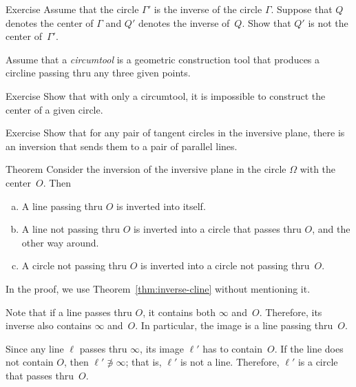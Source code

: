 \begin{thm}{Exercise}\label{ex:inv-center not=center-inv}
Assume that the circle $\Gamma'$ is the inverse of the circle $\Gamma$.
Suppose that $Q$ denotes the center of $\Gamma$ and $Q'$ denotes the inverse of~$Q$.
Show that $Q'$ is not the center of~$\Gamma'$.
\end{thm}

Assume that a {}\emph{circumtool} is a geometric construction tool 
that produces a circline passing thru any three given points.


\begin{thm}{Exercise}\label{ex:circumtool}
Show that with only a circumtool,
it is impossible to construct the center of a given circle.
\end{thm}

\begin{thm}{Exercise}\label{ex:tangent-circ->parallels}
Show that for any pair of tangent circles in the inversive plane, there is an inversion that sends them to a pair of parallel lines.
\end{thm}

\begin{thm}{Theorem}\label{thm:inverse}
Consider the inversion of the inversive plane 
in the circle $\Omega$ with the center~$O$. 
Then 
\begin{enumerate}[(a)]
\item\label{thm:inverse:line-line}
A line passing thru $O$ is inverted into itself.
\item\label{thm:inverse:line} 
A line not passing thru $O$ is inverted into a circle that passes thru $O$, and the other way around.
\item\label{thm:inverse:circle} 
A circle not passing thru $O$ 
is inverted into a circle not passing thru~$O$. 
\end{enumerate}
\end{thm}

In the proof, we use Theorem~\ref{thm:inverse-cline} without mentioning it.

Note that if a line passes thru $O$, it contains both $\infty$ and~$O$.
Therefore, its inverse also contains $\infty$ and~$O$.
In particular, the image is a line passing thru~$O$.

Since any line $\ell$ passes thru $\infty$, its image $\ell'$ has to contain~$O$.
If the line does not contain $O$, 
then $\ell'\not\ni \infty$;
that is, $\ell'$ is not a line.
Therefore, $\ell'$ is a circle that passes thru~$O$. 

